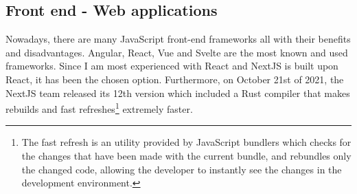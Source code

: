 \documentclass[a4paper, 12pt, oneside]{book}
\begin{document}
\subsection{Front end - Web applications}
Nowadays, there are many JavaScript front-end frameworks all with their benefits and disadvantages. Angular, React, Vue and Svelte are the most known and used frameworks. Since I am most experienced with React and NextJS is built upon React, it has been the chosen option. Furthermore, on October 21st of 2021, the NextJS team released its 12th version which included a Rust compiler that makes rebuilds and fast refreshes\footnote{The fast refresh is an utility provided by JavaScript bundlers which checks for the changes that have been made with the current bundle, and rebundles only the changed code, allowing the developer to instantly see the changes in the development environment.} extremely faster.
\end{document}

